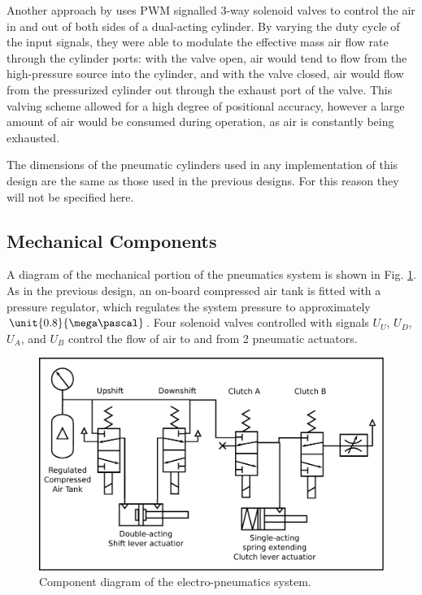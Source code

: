 Another approach by \citet{accurate_position} uses PWM signalled 3-way solenoid valves to control the air in and out of both sides of a dual-acting cylinder. By varying the duty cycle of the input signals, they were able to modulate the effective mass air flow rate through the cylinder ports: with the valve open, air would tend to flow from the high-pressure source into the cylinder, and with the valve closed, air would flow from the pressurized cylinder out through the exhaust port of the valve. This valving scheme allowed for a high degree of positional accuracy, however a large amount of air would be consumed during operation, as air is constantly being exhausted.

The dimensions of the pneumatic cylinders used in any implementation of this design are the same as those used in the previous designs. For this reason they will not be specified here.

\subsection{Mechanical Components}

A diagram of the mechanical portion of the pneumatics system is shown in Fig. \ref{fig:pneumatics_design}. As in the previous design, an on-board compressed air tank is fitted with a pressure regulator, which regulates the system pressure to approximately $\unit{0.8}{\mega\pascal}$. Four solenoid valves controlled with signals $U_U$, $U_D$, $U_A$, and $U_B$ control the flow of air to and from 2 pneumatic actuators.

\begin{figure}[H]
	\centering
	\includegraphics[scale=0.5]{design/figures/pneumatics}
	\caption{Component diagram of the electro-pneumatics system.}
	\label{fig:pneumatics_design}
\end{figure}

